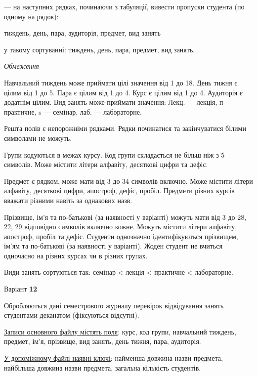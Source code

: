 \documentclass[11pt, ukrainian]{article}
\begin{document}
{\noindent}--- на наступних рядках, починаючи з табуляції, вивести пропуски студента (по одному на рядок):\par
тиждень, день, пара, аудиторія, предмет, вид занять

{\noindent}у такому сортуванні: тиждень, день, пара, предмет, вид занять.


\bigskip\textit{Обмеження}

Навчальний тиждень може приймати цілі значення від 1 до 18.
День тижня є цілим від 1 до 5. Пара є цілим від 1 до 4.
Курс є цілим від 1 до 4. Аудиторія є додатнім цілим.
Вид занять може приймати значення:
Лекц. --- лекція, п --- практичне, s --- семінар, лаб. --- лабораторне.

Решта полів є непорожніми рядками.
Рядки починатися та закінчуватися білими символами не можуть.

Групи кодуються в межах курсу.
Код групи складається не більш ніж з 5 символів.
Може містити літери алфавіту, десяткові цифри та дефіс.

Предмет є рядком, може мати від 3 до 34 символів включно.
Може містити літери алфавіту, десяткові цифри, апостроф, дефіс, пробіл.
Предмети різних курсів вважати різними навіть за однакових назв.

Прізвище, ім’я та по-батькові (за наявності у варіанті)
можуть мати від 3 до 28, 22, 29 відповідно символів включно кожне.
Можуть містити літери алфавіту, апостроф, пробіл та дефіс.
Студенти однозначно ідентифікуються прізвищем, ім’ям та по-батькові (за наявності у варіанті).
Жоден студент не вчиться одночасно на різних курсах чи в різних групах.

Види занять сортуються так: семінар < лекція < практичне < лабораторне.



\par
\newpage
{\center Варіант  \No \textbf { 12 }\par}
\bigskip
Обробляються дані семестрового журналу перевірок відвідування занять студентами деканатом (фіксуються відсутні). 

\underline{Записи основного файлу містять поля}: курс, код групи, навчальний тиждень, предмет, ім’я, прізвище, вид занять, день тижня, пара, аудиторія.

\underline{У допоміжному файлі наявні ключі}: найменша довжина назви предмета, найбільша довжина назви предмета, загальна кількість студентів.
\end{document}
